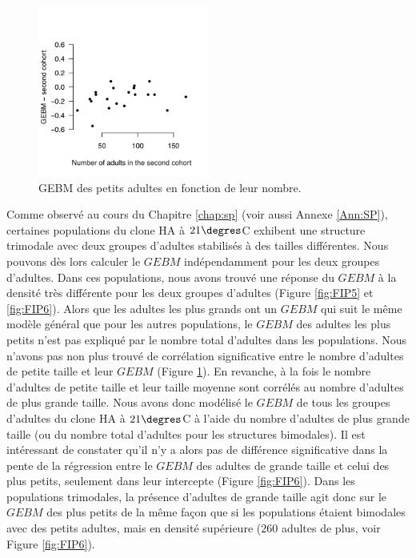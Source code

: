 \begin{figure}[!ht]
\begin{center}
\includegraphics[width=0.5\textwidth]{1_CorpsDeThese/Resumes/Fig/FIP05b}
\caption[GEBM des petits
adultes en fonction de leur nombre]{GEBM des petits
adultes en fonction de leur nombre.}
\label{fig:FIP5b}
\end{center}
\end{figure}

Comme observé au cours du Chapitre \ref{chap:sp} (voir aussi Annexe
\ref{Ann:SP}), certaines populations du clone HA à $21\degres$C exhibent une
structure trimodale avec deux groupes d'adultes stabilisés à des tailles
différentes. Nous pouvons dès lors calculer le $GEBM$ indépendamment pour les
deux groupes d'adultes.
Dans ces populations, nous avons trouvé une réponse du $GEBM$ à la densité très
différente pour les deux groupes d'adultes (Figure \ref{fig:FIP5} et
\ref{fig:FIP6}). Alors que les adultes les plus grands ont un $GEBM$ qui suit le
même modèle général que pour les autres populations, le $GEBM$ des adultes les
plus petits n'est pas expliqué par le nombre total d'adultes dans les
populations. Nous n'avons pas non plus trouvé de corrélation significative entre
le nombre d'adultes de petite taille et leur $GEBM$ (Figure \ref{fig:FIP5b}). En
revanche, à la fois le nombre d'adultes de petite taille et leur taille moyenne sont corrélés au nombre
d'adultes de plus grande taille. Nous avons donc modélisé le $GEBM$ de tous les
groupes d'adultes du clone HA à $21\degres$C à l'aide du nombre d'adultes de
plus grande taille (ou du nombre total d'adultes pour les structures bimodales).
Il est intéressant de constater qu'il n'y a alors pas de différence
significative dans la pente de la régression entre le $GEBM$ des adultes de
grande taille et celui des plus petits, seulement dans leur intercepte (Figure
\ref{fig:FIP6}). Dans les populations trimodales, la présence d'adultes de
grande taille agit donc sur le $GEBM$ des plus petits de la même façon que si
les populations étaient bimodales avec des petits adultes, mais en densité
supérieure ($260$ adultes de plus, voir Figure \ref{fig:FIP6}).

